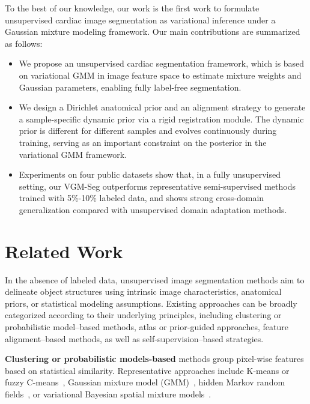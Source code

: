 \documentclass[preprint,12pt]{elsarticle}
\begin{document}
%
To the best of our knowledge, our work is the first work to formulate unsupervised cardiac image segmentation as variational inference under a Gaussian mixture modeling framework.
%
Our main contributions are summarized as follows:
\begin{itemize}
  \item We propose an unsupervised cardiac segmentation framework, which is based on variational GMM in image feature space to estimate mixture weights and Gaussian parameters, enabling fully label-free segmentation.
  \item We design a Dirichlet anatomical prior and an alignment strategy to generate a sample-specific dynamic prior via a rigid registration module. The dynamic prior is different for different samples and evolves continuously during training, serving as an important constraint on the posterior in the variational GMM framework.
  \item Experiments on four public datasets show that, in a fully unsupervised setting, our VGM-Seg outperforms representative semi-supervised methods trained with 5\%-10\% labeled data, and shows strong cross-domain generalization compared with unsupervised domain adaptation methods.
\end{itemize}


\section{Related Work}

In the absence of labeled data, unsupervised image segmentation methods aim to delineate object structures using intrinsic image characteristics, anatomical priors, or statistical modeling assumptions. Existing approaches can be broadly categorized according to their underlying principles, including clustering or probabilistic model–based methods, atlas or prior-guided approaches, feature alignment–based methods, as well as self-supervision–based strategies. 

%
\textbf{Clustering or probabilistic models-based} methods group pixel-wise features based on statistical similarity. Representative approaches include K-means or fuzzy C-means~\cite{pham2002adaptive}, Gaussian mixture model (GMM)~\cite{bishop2006pattern}, hidden Markov random fields~\cite{fan2020unsupervised}, or variational Bayesian spatial mixture models~\cite{woolrich2006variational}.
\end{document}
